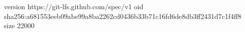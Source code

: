version https://git-lfs.github.com/spec/v1
oid sha256:a681553eeb09abe99a8ba2262cd0436b33b71c16fd6de8db3ff2431d7c1f4ff8
size 22000
